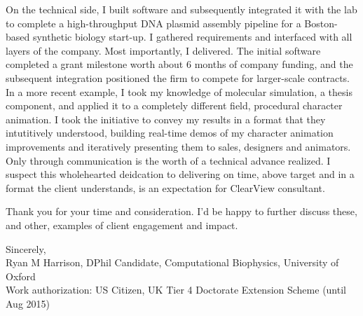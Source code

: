 \documentclass{../res}
\begin{document}
\begin{sloppypar}
\begin{resume}
On the technical side, I built software and subsequently integrated it with the lab to complete a high-throughput DNA plasmid assembly pipeline for a Boston-based synthetic biology start-up. I gathered requirements and interfaced with all layers of the company. Most importantly, I delivered. The initial software completed a grant milestone worth about 6 months of company funding, and the subsequent integration positioned the firm to compete for larger-scale contracts. In a more recent example, I took my knowledge of molecular simulation, a thesis component, and applied it to a completely different field, procedural character animation. I took the initiative to convey my results in a format that they intutitively understood, building real-time demos of my character animation improvements and iteratively presenting them to sales, designers and animators. Only through communication is the worth of a technical advance realized. I suspect this wholehearted deidcation to delivering on time, above target and in a format the client understands, is an expectation for ClearView consultant.

Thank you for your time and consideration. I'd be happy to further discuss these, and other, examples of client engagement and impact.

Sincerely, \\
Ryan M Harrison, DPhil Candidate, Computational Biophysics, University of Oxford \\
Work authorization: US Citizen, UK Tier 4 Doctorate Extension Scheme (until Aug 2015)
\end{resume} 
\end{sloppypar}
\end{document}
